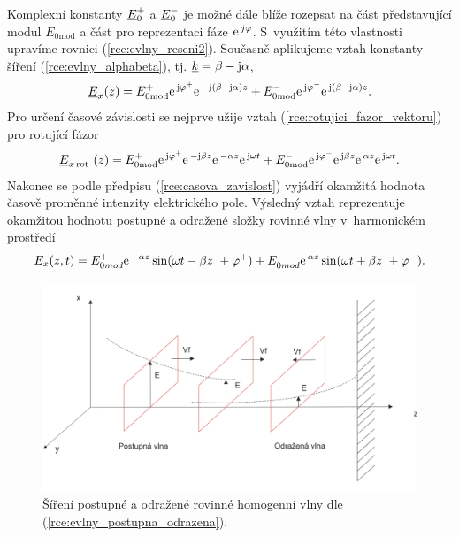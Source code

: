 Komplexní konstanty ${\underline{E}}_{0}^{+}$ a ${\underline{E}}_{0}^{-}$ je možné dále blíže rozepsat na část představující modul $E_{0\mathrm{mod}}$ a část pro reprezentaci fáze $\mathrm{e\,}^{j\varphi}$. S~využitím této vlastnosti upravíme rovnici (\ref{rce:evlny_reseni2}). Současně aplikujeme vztah konstanty šíření (\ref{rce:evlny_alphabeta}), tj. ${\underline{k}} = \beta - \mathrm{j}\alpha$,
\begin{displaymath}
	{\underline{E}}_{x}(z) = E_{0\mathrm{mod}}^{+}\mathrm{e\,}^{\mathrm{j}\varphi^{+}}\mathrm{e\,}^{-\mathrm{j}(\beta - \mathrm{j}\alpha)z} + E_{0\mathrm{mod}}^{-}\mathrm{e\,}^{\mathrm{j}\varphi^{-}}\mathrm{e\,}^{\mathrm{j}(\beta-\mathrm{j}\alpha)z}.
\end{displaymath}
Pro určení časové závislosti se nejprve užije vztah (\ref{rce:rotujici_fazor_vektoru}) pro rotující fázor
\begin{displaymath}
	{\underline{E}}_{x\,\mathrm{rot}\ }(z) = E_{0\mathrm{mod}}^{+}\mathrm{e\,}^{\mathrm{j}\varphi^{+}}\mathrm{e\,}^{-\mathrm{j}\beta z}\mathrm{e\,}^{-\alpha z}\mathrm{e\,}^{\mathrm{j}\omega t} + E_{0\mathrm{mod}}^{-}\mathrm{e\,}^{\mathrm{j}\varphi^{-}}\mathrm{e\,}^{\mathrm{j}\beta z}\mathrm{e\,}^{\alpha z}\mathrm{e\,}^{\mathrm{j}\omega t}.
\end{displaymath}
Nakonec se podle předpisu (\ref{rce:casova_zavislost}) vyjádří okamžitá hodnota časově proměnné intenzity elektrického pole. Výsledný vztah reprezentuje okamžitou hodnotu postupné a odražené složky rovinné vlny v~harmonickém prostředí
\begin{equation}
	E_{x}(z,t) = E_{0mod}^{+}\mathrm{e\,}^{-\alpha z}\sin(\omega t - \beta z~+ \varphi^{+}) + E_{0mod}^{-}\mathrm{e\,}^{\alpha z}\sin(\omega t + \beta z~+ \varphi^{-}).
	\label{rce:evlny_postupna_odrazena}
\end{equation}

\begin{figure}[!h]
	\centering
	\includegraphics[width=14cm]{evlny_postupna_odrazena.png}
	\caption{Šíření postupné a odražené rovinné homogenní vlny dle (\ref{rce:evlny_postupna_odrazena}).}
	\label{obr:evlny_postupna_odrazena}
\end{figure}
